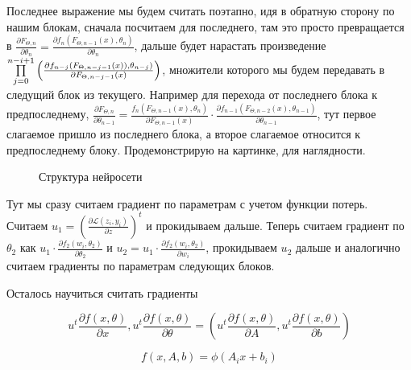 \documentclass{article}
\begin{document}
Последнее выражение мы будем считать поэтапно, идя в обратную сторону по нашим блокам, сначала посчитаем для последнего, там это просто превращается в $\frac{\partial F_{\Theta, n}}{\partial \theta_n} = \frac{\partial f_n(F_{\Theta, n - 1}(x), \theta_n)}{\partial \theta_n}$, дальше будет нарастать произведение $\Prod{j = 0}{n - i + 1} \left( \frac{\partial f_{n - j}(F_{\Theta, n - j - 1}(x)), \theta_{n - j})}{\partial F_{\Theta, n - j - 1}(x)} \right)$, множители которого мы будем передавать в следущий блок из текущего. Например для перехода от последнего блока к предпоследнему, $\frac{\partial F_{\Theta, n}}{\partial \theta_{n - 1}} = \frac{f_n(F_{\Theta, n - 1}(x), \theta_n)}{\partial F_{\Theta, n - 1}(x)} \cdot \frac{\partial f_{n - 1}(F_{\Theta, n - 2}(x), \theta_{n - 1})}{\partial \theta_{n - 1}}$, тут первое слагаемое пришло из последнего блока, а второе слагаемое относится к предпоследнему блоку. Продемонстрирую на картинке, для наглядности.
\begin{figure}[h]
    \caption{Структура нейросети}
\end{figure}

Тут мы сразу считаем градиент по параметрам с учетом функции потерь. Считаем $u_1 = \left(\frac{\partial \mathscr{L}(z_i, y_i)}{\partial z}\right)^t$ и прокидываем дальше. Теперь считаем градиент по $\theta_2$ как $u_1 \cdot \frac{\partial f_2(w_i, \theta_2)}{\partial \theta_2}$ и $u_2 = u_1 \cdot \frac{\partial f_2(w_i, \theta_2)}{\partial w_i}$, прокидываем $u_2$ дальше и аналогично считаем градиенты по параметрам следующих блоков.

Осталось научиться считать градиенты

$$
u^t\frac{\partial f(x, \theta)}{\partial x}, u^t\frac{\partial f(x, \theta)}{\partial \theta} = \left(u^t\frac{\partial f(x, \theta)}{\partial A}, u^t\frac{\partial f(x, \theta)}{\partial b} \right)
$$

$$
f(x, A, b) = \phi(A_ix + b_i)
$$
\end{document}
